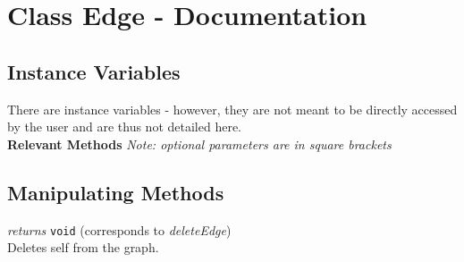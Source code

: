 \documentclass{article}
\newlength\q
\begin{document}
\section{Class Edge - Documentation}

\subsection{Instance Variables}
There are instance variables - however, they are not meant to be directly accessed by the user and are thus not detailed here.\\

\textbf{{\large Relevant Methods}}
\textit{Note: optional parameters are in square brackets}
\subsection{Manipulating Methods}
\begin{description}
\label{deleteEdgeClass}\item[delete()] \emph{returns} \texttt{void} (corresponds to \textit{deleteEdge})\\
Deletes self from the graph.



\end{description}
\end{document}
